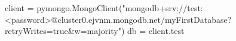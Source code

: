 

client = pymongo.MongoClient("mongodb+srv://test:<password>@cluster0.ejvnm.mongodb.net/myFirstDatabase?retryWrites=true&w=majority")
db = client.test
